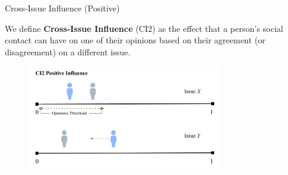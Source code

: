 \documentclass[12pt]{beamer}
\begin{document}
\begin{frame}[c]{Cross-Issue Influence (Positive)}  %

We define \textbf{Cross-Issue Influence} (CI2) as the effect that a person's
social contact can have on one of their opinions based on their agreement (or
disagreement) on a different issue.

\begin{figure}
	\includegraphics[width=0.75\textwidth]{images/CI2Positive.png}
\end{figure}

\end{frame}
\end{document}
